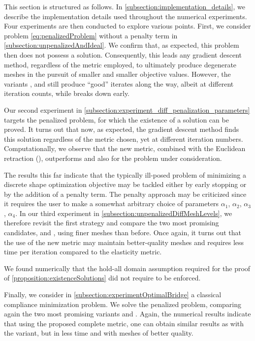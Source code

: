 This section is structured as follows.
In \cref{subsection:implementation_details}, we describe the implementation details used throughout the numerical experiments.
Four experiments are then conducted to explore various points.
First, we consider problem \eqref{eq:penalizedProblem} without a penalty term in \cref{subsection:unpenalizedAndIdeal}.
We confirm that, as expected, this problem then does not possess a solution.
Consequently, this leads any gradient descent method, regardless of the metric employed, to ultimately produce degenerate meshes in the pursuit of smaller and smaller objective values.
However, the variants \ElasEuc, and \CompComp still produce \enquote{good} iterates along the way, albeit at different iteration counts, while \EucEuc breaks down early.

Our second experiment in \cref{subsection:experiment_diff_penalization_parameters} targets the penalized problem, for which the existence of a solution can be proved.
It turns out that now, as expected, the gradient descent method finds this solution regardless of the metric chosen, yet at different iteration numbers.
Computationally, we observe that the new metric, combined with the Euclidean retraction (\CompEuc), outperforms \EucEuc and also \ElasEuc for the problem under consideration.

The results this far indicate that the typically ill-posed problem of minimizing a discrete shape optimization objective may be tackled either by early stopping or by the addition of a penalty term.
The penalty approach may be criticized since it requires the user to make a somewhat arbitrary choice of parameters $\alpha_1$, $\alpha_2$, $\alpha_3$, $\alpha_4$.
In our third experiment in \cref{subsection:unpenalizedDiffMeshLevels}, we therefore revisit the first strategy and compare the two most promising candidates, \ElasEuc and \CompEuc, using finer meshes than before.
Once again, it turns out that the use of the new metric may maintain better-quality meshes and requires less time per iteration compared to the elasticity metric.

We found numerically that the hold-all domain assumption required for the proof of \cref{proposition:existenceSolutions} did not require to be enforced.

Finally, we consider in \cref{subsection:experimentOptimalBridge} a classical compliance minimization problem.
We solve the penalized problem, comparing again the two most promising variants \ElasEuc and \CompEuc.
Again, the numerical results indicate that using the proposed complete metric, one can obtain similar results as with the \ElasEuc variant, but in less time and with meshes of better quality.


